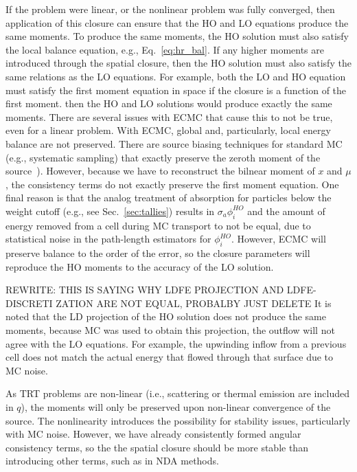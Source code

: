 If the problem were linear, or the nonlinear problem was fully converged,
then application of this closure can ensure that the HO and LO equations produce the same moments.  To produce the
same moments, the HO solution must also satisfy the local balance equation, e.g.,
Eq.~\eqref{eq:hr_bal}.  If any higher moments are introduced through the spatial closure,
then the HO solution must also satisfy the same relations as the LO equations.  For example, both the LO and HO equation must satisfy the
first moment equation in space if the closure is a function of the first moment.  
then the HO and LO solutions would produce exactly the same moments.  There are
several issues with ECMC that cause this to not be true, even for a linear problem.
With ECMC, global and, particularly, local energy balance are not preserved.  There
are source biasing techniques for standard MC (e.g., systematic
sampling) that exactly preserve the zeroth moment of the
source~\cite{shultis_mc,wollaber_review}). 
However, because we have to reconstruct the bilnear moment
of $x$ and $\mu$, the consistency terms do not exactly preserve the first moment
equation.  One final reason is that the analog treatment of absorption for particles below
the weight cutoff (e.g., see Sec.~\ref{sec:tallies}) results in $\sigma_a \phi^{HO}_i$ and the amount
of energy removed from a cell during MC transport to not be equal, due to statistical noise in the
path-length estimators for $\phi^{HO}_i$.  However, ECMC will preserve
balance to the order of the error, so the closure parameters will
reproduce the HO moments to the accuracy of the LO solution.

REWRITE:  THIS IS SAYING WHY LDFE PROJECTION AND LDFE-DISCRETI ZATION ARE NOT EQUAL,
PROBALBY JUST DELETE
It is noted that the LD projection of the HO solution does not produce the same moments, because
MC was used to obtain this projection, the outflow will not agree with the LO equations.
For example, the upwinding inflow from a previous cell does not match the actual energy
that flowed through that surface due to MC noise.



As TRT problems are non-linear (i.e., scattering or thermal emission are included in
$q$), the moments will only be preserved upon non-linear convergence of the source.  The
nonlinearity introduces the possibility for stability
issues, particularly with MC noise.  However, we have already consistently formed angular consistency terms, so the
the spatial closure should be more stable than introducing other terms, such as
in NDA methods. 


